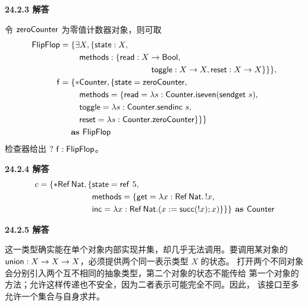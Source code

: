 \begin{taplauthorsolutionentrybox}
\label{sol:author:24.2.3}
\textbf{24.2.3 解答}

令 \(\mathsf{zeroCounter}\) 为零值计数器对象，则可取
\[
\begin{aligned}
\tapltype{FlipFlop}
={}&\{\exists X,\{\taplterm{state}:X,\\
&\quad\taplterm{methods}:\{
\taplterm{read}:X\to\tapltype{Bool},\\
&\hspace{34mm}
\taplterm{toggle}:X\to X,
\taplterm{reset}:X\to X\}\}\},\\
\taplterm{f}
={}&\{*\tapltype{Counter},
\{\taplterm{state}=\taplterm{zeroCounter},\\
&\quad\taplterm{methods}=\{
\taplterm{read}=\lambda s:\tapltype{Counter}.
\taplterm{iseven}(\taplterm{sendget}\ s),\\
&\quad\taplterm{toggle}=\lambda s:\tapltype{Counter}.
\taplterm{sendinc}\ s,\,
\\
&\quad
\taplterm{reset}=\lambda s:\tapltype{Counter}.
\taplterm{zeroCounter}\}\}\}\\
&\textbf{as }\tapltype{FlipFlop}
\end{aligned}
\]
检查器给出 \(?\ \taplterm{f}:\tapltype{FlipFlop}\)。
\end{taplauthorsolutionentrybox}

\begin{taplauthorsolutionentrybox}
\label{sol:author:24.2.4}
\textbf{24.2.4 解答}
\[
\begin{aligned}
c=\{*\mathsf{Ref}\,\mathsf{Nat},
\{&\mathsf{state}=\mathsf{ref}\ 5,\\
&\mathsf{methods}=\{
\mathsf{get}=\lambda x:\mathsf{Ref}\,\mathsf{Nat}.\,!x,\\
&\mathsf{inc}=\lambda x:\mathsf{Ref}\,\mathsf{Nat}.
(x:=\mathsf{succ}(!x);x)\}\}\}
\textbf{ as }\mathsf{Counter}
\end{aligned}
\]
\end{taplauthorsolutionentrybox}

\begin{taplauthorsolutionentrybox}
\label{sol:author:24.2.5}
\textbf{24.2.5 解答}

这一类型确实能在单个对象内部实现并集，却几乎无法调用。要调用某对象的
\(\mathsf{union}:X\to X\to X\)，必须提供两个同一表示类型 \(X\) 的状态。
打开两个不同对象会分别引入两个互不相同的抽象类型，第二个对象的状态不能传给
第一个对象的方法；允许这样传递也不安全，因为二者表示可能完全不同。因此，
该接口至多允许一个集合与自身求并。
\end{taplauthorsolutionentrybox}

